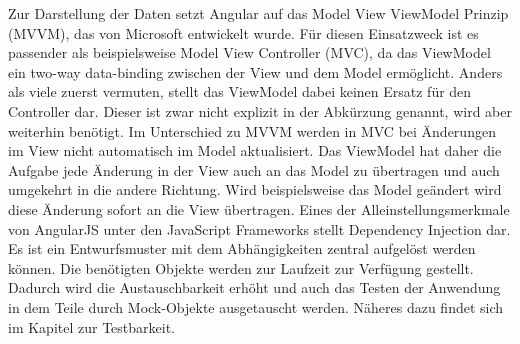 Zur Darstellung der Daten setzt Angular auf das Model View ViewModel Prinzip (MVVM), das von Microsoft entwickelt wurde.
Für diesen Einsatzweck ist es passender als beispielsweise Model View Controller (MVC), da das ViewModel ein two-way data-binding zwischen der View und dem Model ermöglicht.
Anders als viele zuerst vermuten, stellt das ViewModel dabei keinen Ersatz für den Controller dar.
Dieser ist zwar nicht explizit in der Abkürzung genannt, wird aber weiterhin benötigt.
Im Unterschied zu MVVM werden in MVC bei Änderungen im View nicht automatisch im Model aktualisiert.
Das ViewModel hat daher die Aufgabe jede Änderung in der View auch an das Model zu übertragen und auch umgekehrt in die andere Richtung.
Wird beispielsweise das Model geändert wird diese Änderung sofort an die View übertragen.
Eines der Alleinstellungsmerkmale von AngularJS unter den JavaScript Frameworks stellt Dependency Injection dar.
Es ist ein Entwurfsmuster mit dem Abhängigkeiten zentral aufgelöst werden können.
Die benötigten Objekte werden zur Laufzeit zur Verfügung gestellt.
Dadurch wird die Austauschbarkeit erhöht und auch das Testen der Anwendung in dem Teile durch Mock-Objekte ausgetauscht werden.
Näheres dazu findet sich im Kapitel zur Testbarkeit.

